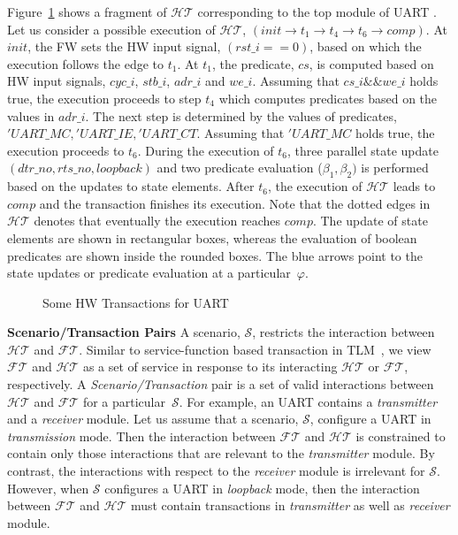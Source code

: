 \documentclass[sigconf]{acmart}
\begin{document}
Figure~\ref{fig:interleaving2} shows a fragment of $\mathcal{HT}$
corresponding to the top module of UART .  Let us consider a possible
execution of $\mathcal{HT}$, $(init \rightarrow t_1 \rightarrow t_4
\rightarrow t_6 \rightarrow comp)$.  At $init$, the FW sets the HW input
signal, $(rst\_i==0)$, based on which the execution follows the edge to
$t_1$.  At $t_1$, the predicate, $cs$, is computed based on HW input
signals, $cyc\_i$, $stb\_i$, $adr\_i$ and $we\_i$.  Assuming that $cs\_i
\&\& we\_i$ holds true, the execution proceeds to step $t_4$ which computes
predicates based on the values in $adr\_i$.  The next step is determined by
the values of predicates, $'UART\_MC, 'UART\_IE, 'UART\_CT$.  Assuming that
$'UART\_MC$ holds true, the execution proceeds to $t_6$.  During the
execution of $t_6$, three parallel state update $(dtr\_no, rts\_no,
loopback)$ and two predicate evaluation ($\beta_1,\beta_2)$ is performed
based on the updates to state elements.  After $t_6$, the execution of
$\mathcal{HT}$ leads to $comp$ and the transaction finishes its execution. 
Note that the dotted edges in $\mathcal{HT}$ denotes that eventually the
execution reaches $comp$.  The update of state elements are shown in
rectangular boxes, whereas the evaluation of boolean predicates are shown
inside the rounded boxes.  The blue arrows point to the state updates or
predicate evaluation at a particular~$\varphi$. \\
%
\begin{figure}[t]
\caption{Some HW Transactions for UART
\label{fig:interleaving2}}
\end{figure}
%
\textbf{Scenario/Transaction Pairs}
%
A scenario, $\mathcal{S}$, restricts the interaction between $\mathcal{HT}$
and $\mathcal{FT}$.  Similar to service-function based transaction in
TLM~\cite{hvc}, we view $\mathcal{FT}$ and $\mathcal{HT}$ as a set of
service in response to its interacting $\mathcal{HT}$ or $\mathcal{FT}$,
respectively.  A {\em Scenario/Transaction} pair is a set of valid
interactions between $\mathcal{HT}$ and $\mathcal{FT}$ for a
particular~$\mathcal{S}$.  For example, an UART  contains a {\em
transmitter} and a {\em receiver} module.  Let us assume that a scenario,
$\mathcal{S}$, configure a UART in {\em transmission} mode.  Then the
interaction between $\mathcal{FT}$ and $\mathcal{HT}$ is constrained to
contain only those interactions that are relevant to the {\em transmitter}
module.  By contrast, the interactions with respect to the {\em receiver}
module is irrelevant for $\mathcal{S}$.  However, when $\mathcal{S}$
configures a UART in {\em loopback} mode, then the interaction between
$\mathcal{FT}$ and $\mathcal{HT}$ must contain transactions in {\em
transmitter} as well as {\em receiver} module.
%
\end{document}
